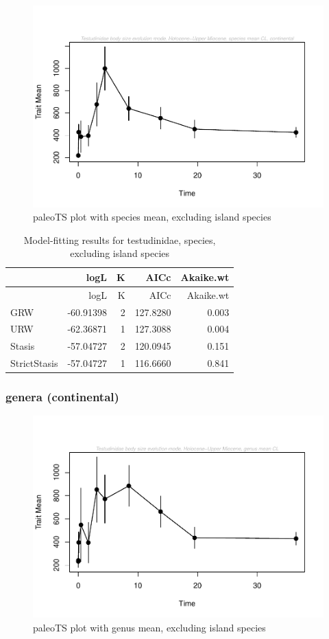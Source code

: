\documentclass[]{article}
\begin{document}
\begin{figure}[htbp]
\centering
\includegraphics{MA_JJ_files/figure-latex/paleoTS plot with species mean, excluding island species-1.pdf}
\caption{paleoTS plot with species mean, excluding island species}
\end{figure}

\begin{longtable}[]{@{}lrrrr@{}}
\caption{Model-fitting results for testudinidae, species, excluding
island species}\tabularnewline
\toprule
& logL & K & AICc & Akaike.wt\tabularnewline
\midrule
\endfirsthead
\toprule
& logL & K & AICc & Akaike.wt\tabularnewline
\midrule
\endhead
GRW & -60.91398 & 2 & 127.8280 & 0.003\tabularnewline
URW & -62.36871 & 1 & 127.3088 & 0.004\tabularnewline
Stasis & -57.04727 & 2 & 120.0945 & 0.151\tabularnewline
StrictStasis & -57.04727 & 1 & 116.6660 & 0.841\tabularnewline
\bottomrule
\end{longtable}

\newpage

\subsubsection{genera (continental)}\label{genera-continental}

\begin{figure}[htbp]
\centering
\includegraphics{MA_JJ_files/figure-latex/paleoTS plot with genus mean, excluding island species-1.pdf}
\caption{paleoTS plot with genus mean, excluding island species}
\end{figure}
\end{document}
